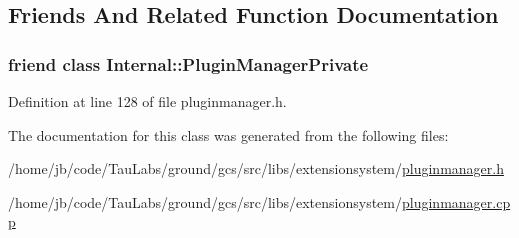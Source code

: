 \subsection{\-Friends \-And \-Related \-Function \-Documentation}
\hypertarget{class_extension_system_1_1_plugin_manager_ac886620628a69def5b6d57fa12c39179}{
\subsubsection[{\-Internal\-::\-Plugin\-Manager\-Private}]{\setlength{\rightskip}{0pt plus 5cm}friend class {\bf \-Internal\-::\-Plugin\-Manager\-Private}}}\label{class_extension_system_1_1_plugin_manager_ac886620628a69def5b6d57fa12c39179}


\-Definition at line 128 of file pluginmanager.\-h.



\-The documentation for this class was generated from the following files\-:\begin{DoxyCompactItemize}
\item 
/home/jb/code/\-Tau\-Labs/ground/gcs/src/libs/extensionsystem/\hyperlink{pluginmanager_8h}{pluginmanager.\-h}\item 
/home/jb/code/\-Tau\-Labs/ground/gcs/src/libs/extensionsystem/\hyperlink{pluginmanager_8cpp}{pluginmanager.\-cpp}\end{DoxyCompactItemize}

